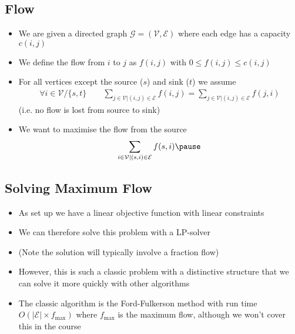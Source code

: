 
\begin{slide}
\section[-1]{Flow}

\begin{PauseHighLight}
  \begin{itemize}
  \item We are given a directed graph $\mathcal{G} = (\mathcal{V},
    \mathcal{E})$ where each edge has a capacity $c(i,j)$\pause
  \item We define the flow from $i$ to $j$ as $f(i,j)$ with $0 \leq
    f(i,j) \leq c(i,j)$\pause
  \item For all vertices except the source ($s$) and sink ($t$) we assume
    \begin{align*}
      \forall i \in \mathcal{V}/\{s,t\} \quad\quad
    \sum_{j\in\mathcal{V}| (i,j)\in\mathcal{E}} f(i, j) = 
    \sum_{j\in\mathcal{V}| (i,j)\in\mathcal{E}} f(j, i)
    \end{align*}
    (i.e. no flow is lost from source to sink)\pause
  \item We want to maximise the flow from the source
    \begin{align*}
      \sum_{i\in\mathcal{V}| (s,i)\in\mathcal{E}} f(s,i)\pause
    \end{align*}
  \end{itemize}
\end{PauseHighLight}

\end{slide}


\begin{slide}
\section[-2]{Solving Maximum Flow}

\begin{PauseHighLight}
  \begin{itemize}
  \item As set up we have a linear objective function with linear
    constraints\pause
  \item We can therefore solve this problem with a LP-solver\pause
  \item (Note the solution will typically involve a fraction flow)\pause
  \item However, this is such a classic problem with a distinctive
    structure that we can solve it more quickly with other
    algorithms\pause
  \item The classic algorithm is the Ford-Fulkerson method with run time
    $O(|\mathcal{E}| \times f_{\max})$ where $f_{\max}$ is the maximum
    flow, although we
    won't cover this in the course\pause
  \end{itemize}
\end{PauseHighLight}

\end{slide}

